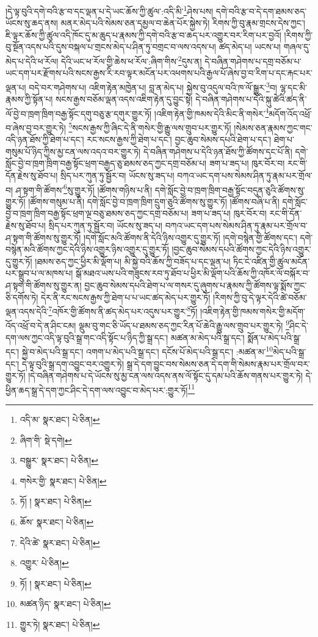 །དེ་ལྟ་བུའི་དགེ་བའི་རྩ་བ་དང་ལྡན་པ་དེ་ཡང་ཆོས་ཀྱི་ཚུལ་:འདི་མི་\footnote{འདི་མ་  སྣར་ཐང་།  པེ་ཅིན། }ཤེས་པས། དགེ་བའི་རྩ་བ་དེ་དག་ཐམས་ཅད་ཡོངས་སུ་ཆད་ནས། མནར་མེད་པའི་སེམས་ཅན་དམྱལ་བ་ཆེན་པོར་སྐྱེས་ཏེ། རིགས་ཀྱི་བུ་རྣམ་གྲངས་དེས་ཀྱང་། ཇི་ལྟར་ཆོས་ཀྱི་ཚུལ་འདི་ཁོང་དུ་མ་ཆུད་པ་རྣམས་ཀྱི་དགེ་བའི་རྩ་བ་ཆད་པར་འགྱུར་བར་རིག་པར་བྱའོ། །རིགས་ཀྱི་བུ་སྔོན་འདས་པའི་དུས་བསྐལ་པ་གྲངས་མེད་པ་ཤིན་ཏུ་བགྲང་བ་ལས་འདས་པ། ཚད་མེད་པ། ཡངས་པ། གཞལ་དུ་མེད་པ་དེའི་ཕ་རོལ། དེའི་ཡང་ཕ་རོལ་གྱི་ཆེས་ཕ་རོལ་:ཞིག་གིས་\footnote{ཞིག་གི་  སྡེ་དགེ། }དུས་ན། དེ་བཞིན་གཤེགས་པ་དགྲ་བཅོམ་པ་ཡང་དག་པར་རྫོགས་པའི་སངས་རྒྱས་རི་རབ་ལྟར་མངོན་པར་འཕགས་པའི་རྒྱལ་པོ་ཞེས་བྱ་བ་རིག་པ་དང་རྐང་པར་ལྡན་པ། བདེ་བར་གཤེགས་པ། འཇིག་རྟེན་མཁྱེན་པ། བླ་ན་མེད་པ། སྐྱེས་བུ་འདུལ་བའི་ཁ་ལོ་སྒྱུར་\footnote{བསྒྱུར་  སྣར་ཐང་།  པེ་ཅིན། }བ། ལྷ་དང་མི་རྣམས་ཀྱི་སྟོན་པ། སངས་རྒྱས་བཅོམ་ལྡན་འདས་འཇིག་རྟེན་དུ་བྱུང་སྟེ། དེ་བཞིན་གཤེགས་པ་དེའི་སྐུ་ཚེའི་ཚད་ནི་ལོ་བྱེ་བ་ཁྲག་ཁྲིག་བརྒྱ་སྟོང་དགུ་བཅུ་རྩ་དགུར་གྱུར་ཏོ། །འཇིག་རྟེན་གྱི་ཁམས་དེའི་མིང་ནི་གསེར་\footnote{གསེར་གྱི་  སྣར་ཐང་།  པེ་ཅིན། }མདོག་འོད་འཕྲོ་བ་ཞེས་བྱ་བར་གྱུར་ཏེ། \footnote{ཏོ། །   སྣར་ཐང་།  པེ་ཅིན། }སངས་རྒྱས་ཀྱི་ཞིང་དེ་ནི་གསེར་གྱི་རྒྱུ་ལས་གྲུབ་པར་གྱུར་ཏོ། །སེམས་ཅན་རྣམས་ཀྱང་གང་འདི་ཉན་ཐོས་ཀྱི་ཐེག་པ་དང་། རང་སངས་རྒྱས་ཀྱི་ཐེག་པ་དང་། བྱང་ཆུབ་སེམས་དཔའི་ཐེག་པ་དང་། ཐེག་པ་གསུམ་པོ་ཉིད་ཀྱིས་མྱ་ངན་ལས་འདའ་བར་གྱུར་ཏེ། དེ་བཞིན་གཤེགས་པ་དེའི་ཉན་ཐོས་ཀྱི་ཚོགས་དང་པོ་ནི། དགེ་སློང་བྱེ་བ་ཁྲག་ཁྲིག་བརྒྱ་སྟོང་ཕྲག་བརྒྱད་ཅུ་ཐམས་ཅད་ཀྱང་དགྲ་བཅོམ་པ། ཟག་པ་ཟད་པ། ཁུར་བོར་བ། རང་གི་དོན་རྗེས་སུ་ཐོབ་པ། སྲིད་པར་ཀུན་ཏུ་སྦྱོར་བ། ཡོངས་སུ་ཟད་པ། བཀའ་ཡང་དག་པས་སེམས་ཤིན་ཏུ་རྣམ་པར་གྲོལ་བ། ཤ་སྟག་གི་ཚོགས་\footnote{ཆོས་  སྣར་ཐང་།  པེ་ཅིན། }སུ་གྱུར་ཏོ། །ཚོགས་གཉིས་པ་ནི། དགེ་སློང་བྱེ་བ་ཁྲག་ཁྲིག་བརྒྱ་སྟོང་བདུན་ཅུའི་ཚོགས་སུ་གྱུར་ཏོ། །ཚོགས་གསུམ་པ་ནི། དགེ་སློང་བྱེ་བ་ཁྲག་ཁྲིག་དྲུག་ཅུའི་ཚོགས་སུ་གྱུར་ཏོ། །ཚོགས་བཞི་པ་ནི། དགེ་སློང་བྱེ་བ་ཁྲག་ཁྲིག་བརྒྱ་སྟོང་ཕྲག་ལྔ་བཅུ་ཐམས་ཅད་ཀྱང་དགྲ་བཅོམ་པ། ཟག་པ་ཟད་པ། ཁུར་བོར་བ། རང་གི་དོན་རྗེས་སུ་ཐོབ་པ། སྲིད་པར་ཀུན་ཏུ་སྦྱོར་བ། ཡོངས་སུ་ཟད་པ། བཀའ་ཡང་དག་པས་སེམས་ཤིན་ཏུ་རྣམ་པར་གྲོལ་བ་ཤ་སྟག་གི་ཚོགས་སུ་གྱུར་ཏོ། །དགེ་སློང་མའི་ཚོགས་ནི་དེའི་ཉིས་འགྱུར་དུ་གྱུར་ཏོ། །དགེ་བསྙེན་གྱི་ཚོགས་དང་། དགེ་བསྙེན་མའི་ཚོགས་ཀྱང་དེའི་ཉིས་འགྱུར་ཉིས་འགྱུར་དུ་གྱུར་ཏོ། །བྱང་ཆུབ་སེམས་དཔའི་ཚོགས་ཀྱང་དེའི་ཉིས་འགྱུར་དུ་གྱུར་ཏོ། །ཐམས་ཅད་ཀྱང་ཕྱིར་མི་ལྡོག་པ། མི་སྐྱེ་བའི་ཆོས་ཀྱི་བཟོད་པ་དང་ལྡན་པ། ཏིང་ངེ་འཛིན་གྱི་ཚུལ་མངོན་པར་སྒྲུབ་པ་ལ་མཁས་པ། སྒོ་མཐའ་ཡས་པའི་གཟུངས་རབ་ཏུ་ཐོབ་པ་ཕྱིར་མི་ལྡོག་པའི་ཆོས་ཀྱི་འཁོར་ལོ་བསྐོར་བ་ཤ་སྟག་གི་ཚོགས་སུ་གྱུར་ན། བྱང་ཆུབ་སེམས་དཔའི་ཐེག་པ་ལ་གསར་དུ་ཞུགས་པ་རྣམས་ཀྱི་ཚོགས་ལྟ་སྨོས་ཀྱང་ཅི་དགོས་ཏེ། དེར་ནི་རང་སངས་རྒྱས་ཀྱི་ཐེག་པ་པ་ཡང་ཚད་མེད་པར་གྱུར་ཏོ། །རིགས་ཀྱི་བུ་དེ་ལྟར་དེའི་ཚེ་བཅོམ་ལྡན་འདས་དེའི་\footnote{དེའི་ཚེ་  སྣར་ཐང་།  པེ་ཅིན། }འཁོར་གྱི་ཚོགས་ནི་ཚད་མེད་པར་འདུས་པར་གྱུར་\footnote{འགྱུར་  པེ་ཅིན། }ཏོ། །འཇིག་རྟེན་གྱི་ཁམས་གསེར་གྱི་མདོག་འོད་འཕྲོ་བ་དེ་ན་ཤིང་ངམ། ལྡུམ་བུ་གང་ཅི་ཡོད་པ་ཐམས་ཅད་ཀྱང་རིན་པོ་ཆེའི་རྒྱུ་ལས་གྲུབ་པར་གྱུར་ཏེ། \footnote{ཏོ། །   སྣར་ཐང་།  པེ་ཅིན། }ཤིང་དེ་དག་ལས་ཀྱང་འདི་ལྟ་བུའི་སྒྲ་གང་འདི་སྟོང་པ་ཉིད་ཀྱི་སྒྲ་དང་། མཚན་མ་མེད་པའི་སྒྲ་དང་། སྨོན་པ་མེད་པའི་སྒྲ་དང་། སྐྱེ་བ་མེད་པའི་སྒྲ་དང་། འགག་པ་མེད་པའི་སྒྲ་དང་། དངོས་པོ་མེད་པའི་སྒྲ་དང་། :མཚན་མ་\footnote{མཚན་ཉིད་  སྣར་ཐང་།  པེ་ཅིན། }མེད་པའི་སྒྲ་དང་། དེ་ལྟ་བུའི་སྒྲ་དག་འབྱུང་བར་འགྱུར་ཏེ། སྒྲ་དེ་དག་བྱུང་བས་སེམས་ཅན་དེ་དག་གི་སེམས་རྣམ་པར་གྲོལ་བར་གྱུར་ཏོ། །དེ་བཞིན་གཤེགས་པ་དེ་ཡོངས་སུ་མྱ་ངན་ལས་འདས་ནས་ལོ་སྟོང་དུ་དམ་པའི་ཆོས་གནས་པར་གྱུར་ཏེ། དེ་ཕྱིན་ཆད་སྒྲ་དེ་དག་ཀྱང་ཤིང་དེ་དག་ལས་འབྱུང་བ་མེད་པར་:གྱུར་ཏོ།\footnote{གྱུར་ཏེ།  སྣར་ཐང་།  པེ་ཅིན། } 